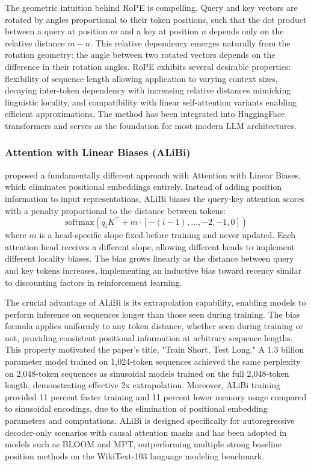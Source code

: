 \documentclass[11pt,letterpaper]{article}
\begin{document}
The geometric intuition behind RoPE is compelling. Query and key vectors are rotated by angles proportional to their token positions, such that the dot product between a query at position $m$ and a key at position $n$ depends only on the relative distance $m - n$. This relative dependency emerges naturally from the rotation geometry: the angle between two rotated vectors depends on the difference in their rotation angles. RoPE exhibits several desirable properties: flexibility of sequence length allowing application to varying context sizes, decaying inter-token dependency with increasing relative distances mimicking linguistic locality, and compatibility with linear self-attention variants enabling efficient approximations. The method has been integrated into HuggingFace transformers and serves as the foundation for most modern LLM architectures.

\subsubsection{Attention with Linear Biases (ALiBi)}

\cite{press2022train} proposed a fundamentally different approach with Attention with Linear Biases, which eliminates positional embeddings entirely. Instead of adding position information to input representations, ALiBi biases the query-key attention scores with a penalty proportional to the distance between tokens:
\begin{equation}
\text{softmax}\left(q_i K^\top + m \cdot [-(i-1), \ldots, -2, -1, 0]\right)
\end{equation}
where $m$ is a head-specific slope fixed before training and never updated. Each attention head receives a different slope, allowing different heads to implement different locality biases. The bias grows linearly as the distance between query and key tokens increases, implementing an inductive bias toward recency similar to discounting factors in reinforcement learning.

The crucial advantage of ALiBi is its extrapolation capability, enabling models to perform inference on sequences longer than those seen during training. The bias formula applies uniformly to any token distance, whether seen during training or not, providing consistent positional information at arbitrary sequence lengths. This property motivated the paper's title, "Train Short, Test Long." A 1.3 billion parameter model trained on 1,024-token sequences achieved the same perplexity on 2,048-token sequences as sinusoidal models trained on the full 2,048-token length, demonstrating effective 2x extrapolation. Moreover, ALiBi training provided 11 percent faster training and 11 percent lower memory usage compared to sinusoidal encodings, due to the elimination of positional embedding parameters and computations. ALiBi is designed specifically for autoregressive decoder-only scenarios with causal attention masks and has been adopted in models such as BLOOM and MPT, outperforming multiple strong baseline position methods on the WikiText-103 language modeling benchmark.
\end{document}
